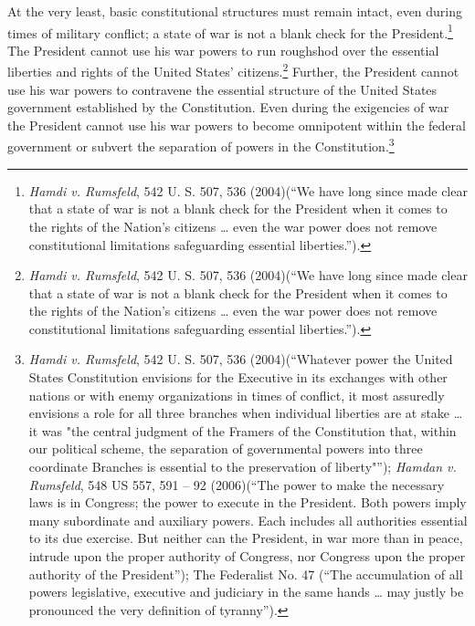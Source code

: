 At the very least, basic constitutional structures must remain intact, even during times of military conflict; a state of war is not a blank check for the President.\footnote{\textit{Hamdi v. Rumsfeld}, 542 U. S. 507, 536 (2004)(``We have long since made clear that a state of war is not a blank check for the President when it comes to the rights of the Nation's citizens … even the war power does not remove constitutional limitations safeguarding essential liberties.'').}  
The President cannot use his war powers to run roughshod over the essential liberties and rights of the United States' citizens.\footnote{\textit{Hamdi v. Rumsfeld}, 542 U. S. 507, 536 (2004)(``We have long since made clear that a state of war is not a blank check for the President when it comes to the rights of the Nation's citizens … even the war power does not remove constitutional limitations safeguarding essential liberties.'').}  
Further, the President cannot use his war powers to contravene the essential structure of the United States government established by the Constitution.  Even during the exigencies of war the President cannot use his war powers to become omnipotent within the federal government or subvert the separation of powers in the Constitution.\footnote{\textit{Hamdi v. Rumsfeld}, 542 U. S. 507, 536 (2004)(``Whatever power the United States Constitution envisions for the Executive in its exchanges with other nations or with enemy organizations in times of conflict, it most assuredly envisions a role for all three branches when individual liberties are at stake … it was "the central judgment of the Framers of the Constitution that, within our political scheme, the separation of governmental powers into three coordinate Branches is essential to the preservation of liberty"''); \textit{Hamdan v. Rumsfeld}, 548 US 557, 591 -- 92 (2006)(``The power to make the necessary laws is in Congress; the power to execute in the President. Both powers imply many subordinate and auxiliary powers. Each includes all authorities essential to its due exercise. But neither can the President, in war more than in peace, intrude upon the proper authority of Congress, nor Congress upon the proper authority of the President''); The Federalist No. 47 (``The accumulation of all powers legislative, executive and judiciary in the same hands … may justly be pronounced the very definition of tyranny'').}


